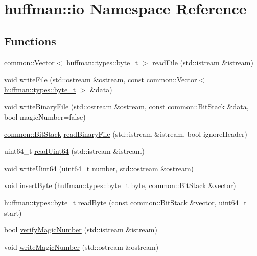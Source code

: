 \hypertarget{namespacehuffman_1_1io}{}\section{huffman\+:\+:io Namespace Reference}
\label{namespacehuffman_1_1io}
\subsection*{Functions}
\begin{DoxyCompactItemize}
\item 
common\+::\+Vector$<$ \hyperlink{namespacehuffman_1_1types_a198fb2bbef1012ab1696124836c56f0d}{huffman\+::types\+::byte\+\_\+t} $>$ \hyperlink{namespacehuffman_1_1io_a3dc9d3bd379dd95a993bff408092514a}{read\+File} (std\+::istream \&istream)
\item 
void \hyperlink{namespacehuffman_1_1io_a46774d6debc0d1318c44db613a700ab0}{write\+File} (std\+::ostream \&ostream, const common\+::\+Vector$<$ \hyperlink{namespacehuffman_1_1types_a198fb2bbef1012ab1696124836c56f0d}{huffman\+::types\+::byte\+\_\+t} $>$ \&data)
\item 
void \hyperlink{namespacehuffman_1_1io_afa4a671ca46f3b2fdb8052639340178f}{write\+Binary\+File} (std\+::ostream \&ostream, const \hyperlink{classcommon_1_1BitStack}{common\+::\+Bit\+Stack} \&data, bool magic\+Number=false)
\item 
\hyperlink{classcommon_1_1BitStack}{common\+::\+Bit\+Stack} \hyperlink{namespacehuffman_1_1io_ada2a069d00c22f9fed6aab608d863276}{read\+Binary\+File} (std\+::istream \&istream, bool ignore\+Header)
\item 
uint64\+\_\+t \hyperlink{namespacehuffman_1_1io_aab7992b4b13288b7ea2a4a1f741f7d65}{read\+Uint64} (std\+::istream \&istream)
\item 
void \hyperlink{namespacehuffman_1_1io_af709b79bf385345e28dc5e3068fc744a}{write\+Uint64} (uint64\+\_\+t number, std\+::ostream \&ostream)
\item 
void \hyperlink{namespacehuffman_1_1io_ada1e15818c5ab806b890ad58a7c58270}{insert\+Byte} (\hyperlink{namespacehuffman_1_1types_a198fb2bbef1012ab1696124836c56f0d}{huffman\+::types\+::byte\+\_\+t} byte, \hyperlink{classcommon_1_1BitStack}{common\+::\+Bit\+Stack} \&vector)
\item 
\hyperlink{namespacehuffman_1_1types_a198fb2bbef1012ab1696124836c56f0d}{huffman\+::types\+::byte\+\_\+t} \hyperlink{namespacehuffman_1_1io_af34a00787e1294fb7b72c7d02d214875}{read\+Byte} (const \hyperlink{classcommon_1_1BitStack}{common\+::\+Bit\+Stack} \&vector, uint64\+\_\+t start)
\item 
bool \hyperlink{namespacehuffman_1_1io_a3672cf6420fd059c8d726e129c7a1e1f}{verify\+Magic\+Number} (std\+::istream \&istream)
\item 
void \hyperlink{namespacehuffman_1_1io_a0dcd66b464011e749fd3d8d7d889c529}{write\+Magic\+Number} (std\+::ostream \&ostream)
\end{DoxyCompactItemize}


